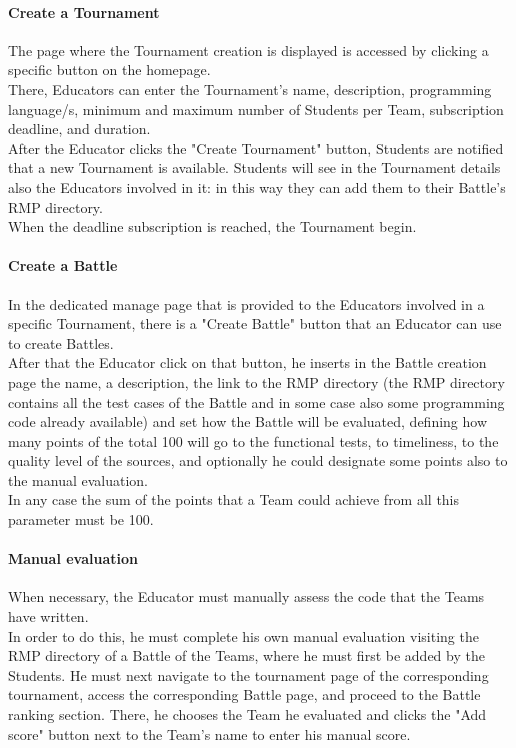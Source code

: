 \paragraph{Create a Tournament}
The page where the Tournament creation is displayed is accessed by clicking a specific button on the homepage.\\
There, Educators can enter the Tournament's name, description, programming language/s, minimum and maximum number of Students per Team, subscription deadline, and duration.\\ 
After the Educator clicks the "Create Tournament" button, Students are notified that a new Tournament is available. Students will see in the Tournament details also the Educators involved in it: in this way they can add them to their Battle's RMP directory.\\
When the deadline subscription is reached, the Tournament begin.
\paragraph{Create a Battle}
In the dedicated manage page that is provided to the Educators involved in a specific Tournament, there is a "Create Battle" button that an Educator can use to create Battles.\\
After that the Educator click on that button, he inserts in the Battle creation page the name, a description, the link to the RMP directory (the RMP directory contains all the test cases of the Battle
and in some case also some programming code already available) and set how the Battle will be evaluated, defining how many points of the total 100 will go to the functional tests, to timeliness, to 
the quality level of the sources, and optionally he could designate some points also to the manual evaluation.\\
In any case the sum of the points that a Team could achieve from all this parameter must be 100.
\paragraph{Manual evaluation}
When necessary, the Educator must manually assess the code that the Teams have written.\\
In order to do this, he must complete his own manual evaluation visiting the RMP directory of a Battle of the Teams, where he must first be added by the Students. He must next navigate to the tournament 
page of the corresponding tournament, access the corresponding Battle page, and proceed to the Battle ranking section. There, he chooses the Team he evaluated and clicks the "Add score" button next to the 
Team's name to enter his manual score.
\newpage
